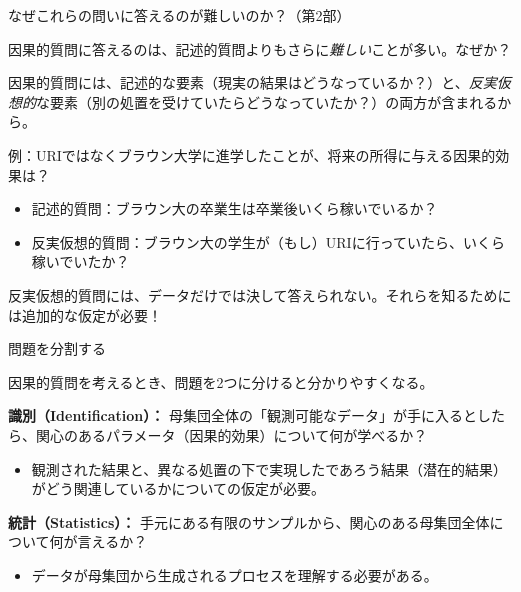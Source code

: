 \documentclass[11pt,handout]{beamer}
\newenvironment{wideitemize}{\itemize\addtolength{\itemsep}{10pt}}{\enditemize}
\begin{document}
\begin{frame}{なぜこれらの問いに答えるのが難しいのか？（第2部）}
\begin{wideitemize}
	\item
	因果的質問に答えるのは、記述的質問よりもさらに\textit{難しい}ことが多い。なぜか？
	
	\pause
	\item
	因果的質問には、記述的な要素（現実の結果はどうなっているか？）と、\textit{反実仮想的}な要素（別の処置を受けていたらどうなっていたか？）の両方が含まれるから。
	
	\pause
	\item
	例：URIではなくブラウン大学に進学したことが、将来の所得に与える因果的効果は？
		\begin{itemize}
			\item
			記述的質問：ブラウン大の卒業生は卒業後いくら稼いでいるか？
			
			\item
			反実仮想的質問：ブラウン大の学生が（もし）URIに行っていたら、いくら稼いでいたか？
		\end{itemize}
		
	\pause 	
	\item 反実仮想的質問には、データだけでは決して答えられない。それらを知るためには追加的な仮定が必要！
\end{wideitemize}	
\end{frame}

\begin{frame}{問題を分割する}
	\begin{wideitemize}
		
		\item
		因果的質問を考えるとき、問題を2つに分けると分かりやすくなる。
		
		\item
		\textbf{識別（Identification）：} 母集団全体の「観測可能なデータ」が手に入るとしたら、関心のあるパラメータ（因果的効果）について何が学べるか？
		\begin{itemize}
			\item 
			観測された結果と、異なる処置の下で実現したであろう結果（潜在的結果）がどう関連しているかについての仮定が必要。
		\end{itemize}
		
		\item
		\textbf{統計（Statistics）：} 手元にある有限のサンプルから、関心のある母集団全体について何が言えるか？
			\begin{itemize}
				\item 
				データが母集団から生成されるプロセスを理解する必要がある。
			\end{itemize} 	
		
	\end{wideitemize}	
	
\end{frame}
\end{document}
